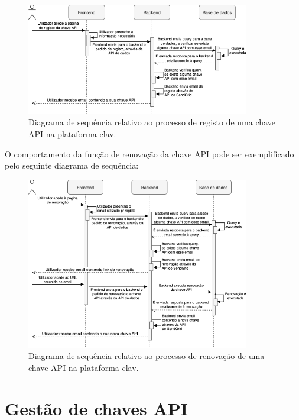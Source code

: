\begin{figure}[H]
    \centering
    \includegraphics[width=0.87\textwidth]{img/diagramas/sequencia/DiagramasSequencia-RegistoAPI.png}
    \caption{Diagrama de sequência relativo ao processo de registo de uma chave API na plataforma \gls{clav}.}
    \label{fig:diagramaSequenciaRegistoAPI}
\end{figure}
\vspace{-5mm}
O comportamento da função de renovação da chave API pode ser exemplificado pelo seguinte diagrama de sequência:
\vspace{-2mm}
\begin{figure}[H]
    \centering
    \includegraphics[width=0.87\textwidth]{img/diagramas/sequencia/DiagramasSequencia-RenovacaoAPI.png}
    \caption{Diagrama de sequência relativo ao processo de renovação de uma chave API na plataforma \gls{clav}.}
    \label{fig:diagramaSequenciaRenovacaoAPI}
\end{figure}

\cleardoublepage
\section{Gestão de chaves API}

